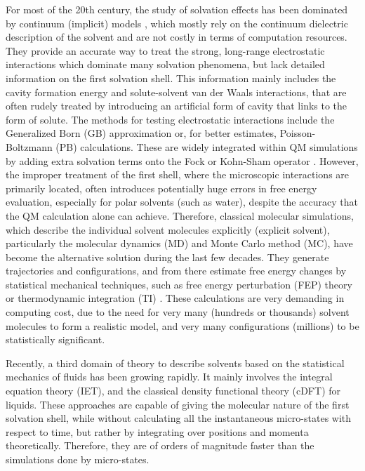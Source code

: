 For most of the 20th century, the study of solvation effects has been
dominated by continuum (implicit) models \citep{Jensen,Cramer_1999},
which mostly rely on the continuum dielectric description of the solvent
and are not costly in terms of computation resources. They provide
an accurate way to treat the strong, long-range electrostatic interactions
which dominate many solvation phenomena, but lack detailed information
on the first solvation shell. This information mainly includes the
cavity formation energy and solute-solvent van der Waals interactions,
that are often rudely treated by introducing an artificial form of
cavity that links to the form of solute. The methods for testing electrostatic
interactions include the Generalized Born (GB) approximation or, for
better estimates, Poisson-Boltzmann (PB) calculations. These are widely
integrated within \acs{QM} simulations by adding extra solvation
terms onto the Fock or Kohn-Sham operator \citep{Tomasi_1994_implicit_model,tomasi_quantum_2005}.
However, the improper treatment of the first shell, where the microscopic
interactions are primarily located, often introduces potentially huge
errors in free energy evaluation, especially for polar solvents (such
as water), despite the accuracy that the \acs{QM} calculation alone
can achieve. Therefore, classical molecular simulations, which describe
the individual solvent molecules explicitly (explicit solvent), particularly
the molecular dynamics (\acs{MD}) and Monte Carlo method (\acs{MC}),
have become the alternative solution during the last few decades.
They generate trajectories and configurations, and from there estimate
free energy changes by statistical mechanical techniques, such as
free energy perturbation (FEP) theory or thermodynamic integration
(TI) \citep{Jorgensen_1995_MC}. These calculations are very demanding
in computing cost, due to the need for very many (hundreds or thousands)
solvent molecules to form a realistic model, and very many configurations
(millions) to be statistically significant.

Recently, a third domain of theory to describe solvents based on the
statistical mechanics of fluids has been growing rapidly. It mainly
involves the integral equation theory (\acs{IET}), and the classical
density functional theory (c\acs{DFT}) for liquids. These approaches
are capable of giving the molecular nature of the first solvation
shell, while without calculating all the instantaneous micro-states
with respect to time, but rather by integrating over positions and
momenta theoretically. Therefore, they are of orders of magnitude
faster than the simulations done by micro-states.


